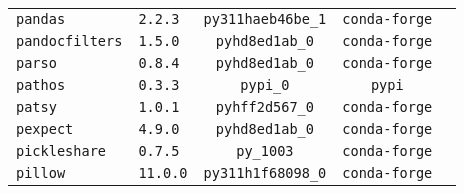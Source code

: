\begin{longtable}{p{}|l|ccc}
\texttt{pandas}                    & \texttt{2.2.3}              & \texttt{py311haeb46be\_1} & \texttt{conda-forge}\\
\texttt{pandocfilters}             & \texttt{1.5.0}              & \texttt{pyhd8ed1ab\_0}    & \texttt{conda-forge}\\
\texttt{parso}                     & \texttt{0.8.4}              & \texttt{pyhd8ed1ab\_0}    & \texttt{conda-forge}\\
\texttt{pathos}                    & \texttt{0.3.3}              & \texttt{pypi\_0}          & \texttt{pypi}\\
\texttt{patsy}                     & \texttt{1.0.1}              & \texttt{pyhff2d567\_0}    & \texttt{conda-forge}\\
\texttt{pexpect}                   & \texttt{4.9.0}              & \texttt{pyhd8ed1ab\_0}    & \texttt{conda-forge}\\
\texttt{pickleshare}               & \texttt{0.7.5}              & \texttt{py\_1003}         & \texttt{conda-forge}\\
\texttt{pillow}                    & \texttt{11.0.0}             & \texttt{py311h1f68098\_0} & \texttt{conda-forge}\\


\end{longtable}
